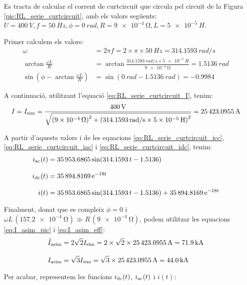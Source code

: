 \begin{exemple}\label{ex:cc-RL}
    Es tracta de calcular el corrent de curtcircuit que circula pel circuit de la Figura \vref{pic:RL_serie_curtcircuit}, amb els valors següents: $U=\SI{400}{V}, f=\SI{50}{Hz}, \phi=\SI{0}{rad}, R=\SI{9e-4}{\ohm}, L=\SI{5e-5}{H}$.

    Primer calculem els valors:
    \begin{align*}
        \omega &= 2\pi f = 2\times\pi\times\SI{50}{Hz} = \SI{314,1593}{rad/s} \\[3mm]
        \arctan\frac{\omega L}{R} &= \arctan\frac{\SI{314,1593}{rad/s}\times\SI{5e-5}{H}}{\SI{9e-4}{\ohm}} =
        \SI{1,5136}{rad}\\[3mm]
        \sin\left(\phi - \arctan\frac{\omega L}{R}\right) &= \sin(\SI{0}{rad} - \SI{1,5136}{rad})= \num{-0,9984}
    \end{align*}


    A continuació, utilitzant l'equació \eqref{eq:RL_serie_curtcircuit_I}, tenim:
    \[
        I= I_\mathrm{sim} =\frac{\SI{400}{V}}{\sqrt{\left(\SI{9e-4}{\ohm}\right)^2+\left(\SI{314,1593}{rad/s}\times \SI{5e-5}{H}\right)^2}} =
        \SI{25423,0955}{A}
    \]

      A partir d'aquests valors i de les equacions \eqref{eq:RL_serie_curtcircuit_icc}, \eqref{eq:RL_serie_curtcircuit_iac} i \eqref{eq:RL_serie_curtcircuit_idc}, tenim:
    \begin{align*}
        i_\mathrm{ac}(t) &= \num{35953,6865}\sin(\num{314,1593}\,t-\num{1,5136}) \\[0.3cm]
        i_\mathrm{dc}(t) &= \num{35894,8169}\,\mathrm{e}^{-18 t}\\[0.3cm]
        i(t) &= \num{35953,6865}\sin(\num{314,1593}\,t-\num{1,5136}) + \num{35894,8169}\,\mathrm{e}^{-18 t}
    \end{align*}

    Finalment, donat que es compleix $\phi=0$ i $\omega L \,(\SI{157,2e-4}{\ohm}) \gg R\, (\SI{9e-4}{\ohm}) $, podem utilitzar les equacions \eqref{eq:I_asim_pic} i \eqref{eq:I_asim_eff}:
    \begin{align*}
        \hat{I}_\mathrm{asim} &= 2 \sqrt{2} I_\mathrm{sim}= 2 \times \sqrt{2} \times \SI{25423,0955}{A} = \SI{71,9}{kA}\\[0.3cm]
        I_\mathrm{asim} &= \sqrt{3} I_\mathrm{sim}= \sqrt{3} \times \SI{25423,0955}{A} = \SI{44,0}{kA}
    \end{align*}

    Per acabar, representem les funcions $i_\mathrm{dc}(t)$, $i_\mathrm{ac}(t)$ i $i(t)$:
    \begin{center}
        
    \end{center}
\end{exemple}


